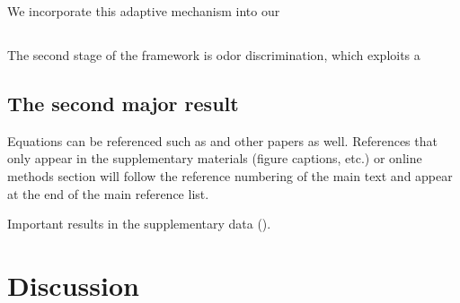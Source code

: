 We incorporate this adaptive mechanism into our 

\subsection*{}

The second stage of the framework is odor discrimination, which exploits a 


\subsection*{The second major result}

Equations can be referenced such as  and other papers as well\cite{Hill78a}. References
that only appear in the supplementary materials (figure captions, etc.) or online methods section
will follow the reference numbering of the main text and appear at the end of the main reference
list. \lipsum[5]

Important results in the supplementary data (). \lipsum[6]

\section*{Discussion}

\lipsum[7-9]

